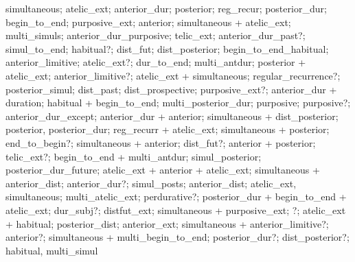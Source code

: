simultaneous; atelic\_ext; anterior\_dur; posterior; reg\_recur; posterior\_dur; begin\_to\_end; purposive\_ext; anterior; simultaneous + atelic\_ext; multi\_simuls; anterior\_dur\_purposive; telic\_ext; anterior\_dur\_past?; simul\_to\_end; habitual?; dist\_fut; dist\_posterior; begin\_to\_end\_habitual; anterior\_limitive; atelic\_ext?; dur\_to\_end; multi\_antdur; posterior + atelic\_ext; anterior\_limitive?; atelic\_ext + simultaneous; regular\_recurrence?; posterior\_simul; dist\_past; dist\_prospective; purposive\_ext?; anterior\_dur + duration; habitual + begin\_to\_end; multi\_posterior\_dur; purposive; purposive?; anterior\_dur\_except; anterior\_dur + anterior; simultaneous + dist\_posterior; posterior, posterior\_dur; reg\_recurr + atelic\_ext; simultaneous + posterior; end\_to\_begin?; simultaneous + anterior; dist\_fut?; anterior + posterior; telic\_ext?; begin\_to\_end + multi\_antdur; simul\_posterior; posterior\_dur\_future; atelic\_ext + anterior + atelic\_ext; simultaneous + anterior\_dist; anterior\_dur?; simul\_posts; anterior\_dist; atelic\_ext, simultaneous; multi\_atelic\_ext; perdurative?; posterior\_dur + begin\_to\_end + atelic\_ext; dur\_subj?; distfut\_ext; simultaneous + purposive\_ext; ?; atelic\_ext + habitual; posterior\_dist; anterior\_ext; simultaneous + anterior\_limitive?; anterior?; simultaneous + multi\_begin\_to\_end; posterior\_dur?; dist\_posterior?; habitual, multi\_simul%